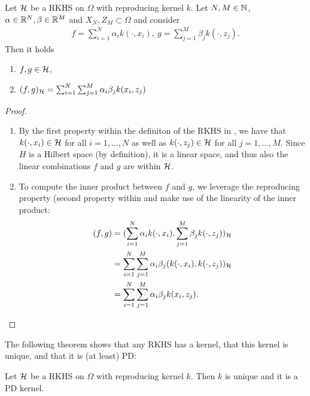 \begin{prop}
\label{prop:rkhs_1}
Let $\mathcal{H}$ be a RKHS on $\Omega$ with reproducing kernel $k$. 
Let $N, M \in \mathbb{N}$, $\alpha \in \mathbb{R}^N, \beta \in \mathbb{R}^M$ and $X_N, Z_M \subset \Omega$ and consider
\begin{align*}
f = \sum_{i=1}^N \alpha_i k(\cdot, x_i), ~ g = \sum_{j=1}^M \beta_j k(\cdot, z_j).
\end{align*}
Then it holds
\begin{enumerate}
\item $f, g \in \mathcal{H}$,
\item $(f, g)_{\mathcal{H}} = \sum_{i=1}^N \sum_{j=1}^M \alpha_i \beta_j k(x_i, z_j)$ 
\end{enumerate}
\end{prop}

\begin{proof}
\begin{enumerate}
\item By the first property within the definiton of the RKHS in , 
we have that $k(\cdot, x_i) \in \mathcal{H}$ for all $i=1, ..., N$ as well as $k(\cdot, z_j) \in \mathcal{H}$ for all $j = 1, ..., M$.
Since $H$ is a Hilbert space (by definition), it is a linear space, 
and thus also the linear combinations $f$ and $g$ are within $\mathcal{H}$.
\item To compute the inner product between $f$ and $g$, we leverage the reproducing property (second property within  and make use of the linearity of the inner product:
\begin{align*}
(f, g) &= (\sum_{i=1}^N \alpha_i k(\cdot, x_i), \sum_{j=1}^M \beta_j k(\cdot, z_j))_{\mathcal{H}} \\
&= \sum_{i=1}^N \sum_{j=1}^M \alpha_i \beta_j (k(\cdot, x_i),  k(\cdot, z_j))_{\mathcal{H}} \\
&= \sum_{i=1}^N \sum_{j=1}^M \alpha_i \beta_j k(x_i, z_j).
\end{align*}
\end{enumerate}

\end{proof}

The following theorem shows that any RKHS has a kernel, that this kernel is unique, and that it is (at least) PD:


\begin{thm}
\label{thm:rkhs_1}
Let $\mathcal{H}$ be a RKHS on $\Omega$ with reproducing kernel $k$.
Then $k$ is unique and it is a PD kernel.
\end{thm}

